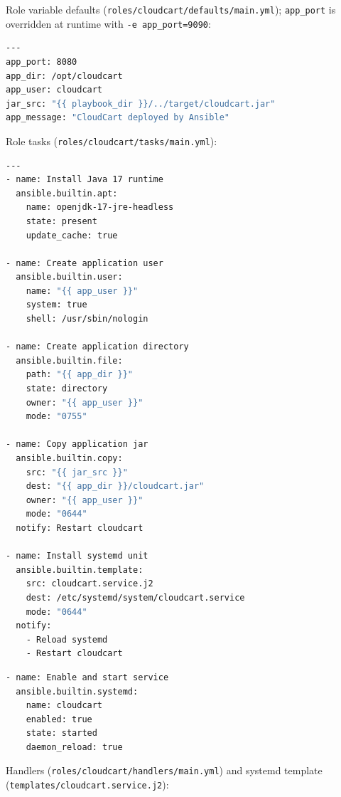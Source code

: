 \documentclass[12pt,a4paper]{article}
\begin{document}
\newpage

Role variable defaults (\texttt{roles/cloudcart/defaults/main.yml}); \texttt{app\_port} is overridden at runtime with \texttt{-e app\_port=9090}:

\begin{lstlisting}[language=bash]
---
app_port: 8080
app_dir: /opt/cloudcart
app_user: cloudcart
jar_src: "{{ playbook_dir }}/../target/cloudcart.jar"
app_message: "CloudCart deployed by Ansible"
\end{lstlisting}

Role tasks (\texttt{roles/cloudcart/tasks/main.yml}):

\begin{lstlisting}[language=bash]
---
- name: Install Java 17 runtime
  ansible.builtin.apt:
    name: openjdk-17-jre-headless
    state: present
    update_cache: true

- name: Create application user
  ansible.builtin.user:
    name: "{{ app_user }}"
    system: true
    shell: /usr/sbin/nologin

- name: Create application directory
  ansible.builtin.file:
    path: "{{ app_dir }}"
    state: directory
    owner: "{{ app_user }}"
    mode: "0755"

- name: Copy application jar
  ansible.builtin.copy:
    src: "{{ jar_src }}"
    dest: "{{ app_dir }}/cloudcart.jar"
    owner: "{{ app_user }}"
    mode: "0644"
  notify: Restart cloudcart

- name: Install systemd unit
  ansible.builtin.template:
    src: cloudcart.service.j2
    dest: /etc/systemd/system/cloudcart.service
    mode: "0644"
  notify:
    - Reload systemd
    - Restart cloudcart
\end{lstlisting}

\newpage

\begin{lstlisting}[language=bash,firstnumber=38]
- name: Enable and start service
  ansible.builtin.systemd:
    name: cloudcart
    enabled: true
    state: started
    daemon_reload: true
\end{lstlisting}

Handlers (\texttt{roles/cloudcart/handlers/main.yml}) and systemd template (\texttt{templates/cloudcart.service.j2}):
\end{document}
